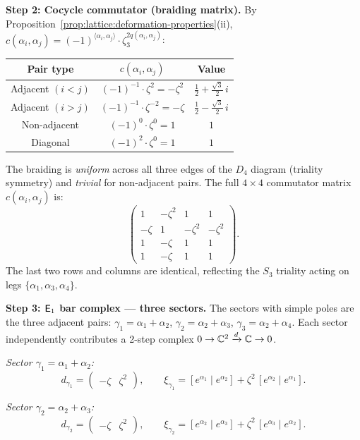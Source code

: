\begin{computation}[\texorpdfstring{$D_4$}{D_4} at the Coxeter root: \texorpdfstring{$N = 3$}{N = 3}, triality]
\noindent\textbf{Step 2: Cocycle commutator (braiding matrix).}
By Proposition~\ref{prop:lattice:deformation-properties}(ii),
$c(\alpha_i,\alpha_j) = (-1)^{\langle\alpha_i,\alpha_j\rangle}
\cdot \zeta_3^{2q(\alpha_i,\alpha_j)}$:
\begin{center}
\renewcommand{\arraystretch}{1.3}
\begin{tabular}{c c c}
Pair type & $c(\alpha_i,\alpha_j)$ & Value \\
\hline
Adjacent $(i < j)$ & $(-1)^{-1} \cdot \zeta^2 = -\zeta^2$
  & $\tfrac{1}{2} + \tfrac{\sqrt{3}}{2}\,i$ \\
Adjacent $(i > j)$ & $(-1)^{-1} \cdot \zeta^{-2} = -\zeta$
  & $\tfrac{1}{2} - \tfrac{\sqrt{3}}{2}\,i$ \\
Non-adjacent & $(-1)^0 \cdot \zeta^0 = 1$
  & $1$ \\
Diagonal & $(-1)^2 \cdot \zeta^0 = 1$
  & $1$
\end{tabular}
\end{center}
The braiding is \emph{uniform} across all three edges of the $D_4$
diagram (triality symmetry) and \emph{trivial} for non-adjacent pairs.
The full $4 \times 4$ commutator matrix $c(\alpha_i,\alpha_j)$ is:
\[
\begin{pmatrix}
1 & -\zeta^2 & 1 & 1 \\
-\zeta & 1 & -\zeta^2 & -\zeta^2 \\
1 & -\zeta & 1 & 1 \\
1 & -\zeta & 1 & 1
\end{pmatrix}.
\]
The last two rows and columns are identical, reflecting the $S_3$
triality acting on legs $\{\alpha_1, \alpha_3, \alpha_4\}$.
\smallskip

\noindent\textbf{Step 3: $\mathsf{E}_1$ bar complex --- three sectors.}
The sectors with simple poles are the three adjacent pairs:
$\gamma_1 = \alpha_1 + \alpha_2$,
$\gamma_2 = \alpha_2 + \alpha_3$,
$\gamma_3 = \alpha_2 + \alpha_4$.
Each sector independently contributes a 2-step complex
$0 \to \mathbb{C}^2 \xrightarrow{d} \mathbb{C} \to 0$.

\emph{Sector $\gamma_1 = \alpha_1 + \alpha_2$:}
\[
d_{\gamma_1}
= \begin{pmatrix} -\zeta & \zeta^2 \end{pmatrix},
\qquad
\xi_{\gamma_1}
= [e^{\alpha_1} \mid e^{\alpha_2}]
  + \zeta^2\,[e^{\alpha_2} \mid e^{\alpha_1}].
\]

\emph{Sector $\gamma_2 = \alpha_2 + \alpha_3$:}
\[
d_{\gamma_2}
= \begin{pmatrix} -\zeta & \zeta^2 \end{pmatrix},
\qquad
\xi_{\gamma_2}
= [e^{\alpha_2} \mid e^{\alpha_3}]
  + \zeta^2\,[e^{\alpha_3} \mid e^{\alpha_2}].
\]


\end{computation}
